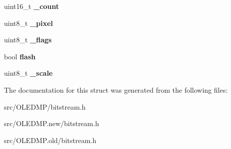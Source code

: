 \begin{DoxyCompactItemize}
\item 
\hypertarget{structbitstream__t_af818e6e9d7218107aa8fcf4e054c5a10}{uint16\-\_\-t {\bfseries \-\_\-count}}\label{structbitstream__t_af818e6e9d7218107aa8fcf4e054c5a10}

\item 
\hypertarget{structbitstream__t_a10c4ba029fe86182aa5dff53d2486072}{uint8\-\_\-t {\bfseries \-\_\-pixel}}\label{structbitstream__t_a10c4ba029fe86182aa5dff53d2486072}

\item 
\hypertarget{structbitstream__t_a5629227e4392e5086f50519e78e4c973}{uint8\-\_\-t {\bfseries \-\_\-flags}}\label{structbitstream__t_a5629227e4392e5086f50519e78e4c973}

\item 
\hypertarget{structbitstream__t_a5a483d65b3bc3c34154e6b31c07e4aa9}{bool {\bfseries flash}}\label{structbitstream__t_a5a483d65b3bc3c34154e6b31c07e4aa9}

\item 
\hypertarget{structbitstream__t_af5b4c32e404214469a25c3865b208385}{uint8\-\_\-t {\bfseries \-\_\-scale}}\label{structbitstream__t_af5b4c32e404214469a25c3865b208385}

\end{DoxyCompactItemize}


The documentation for this struct was generated from the following files\-:\begin{DoxyCompactItemize}
\item 
src/\-O\-L\-E\-D\-M\-P/bitstream.\-h\item 
src/\-O\-L\-E\-D\-M\-P.\-new/bitstream.\-h\item 
src/\-O\-L\-E\-D\-M\-P.\-old/bitstream.\-h\end{DoxyCompactItemize}
